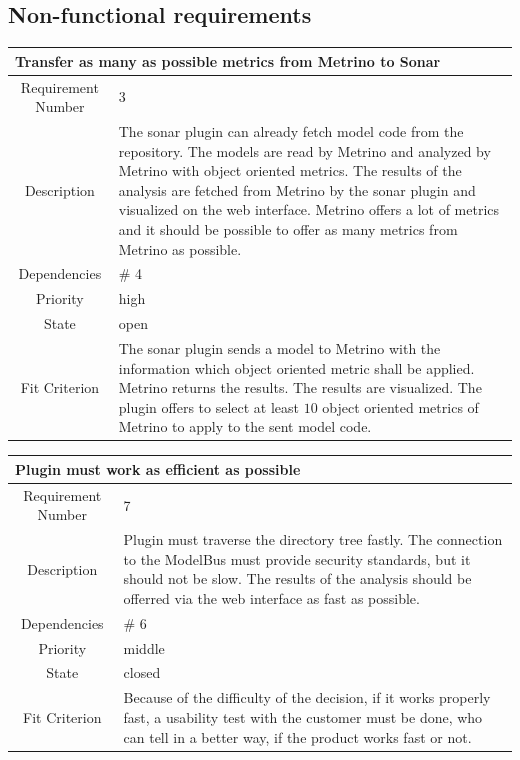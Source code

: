\subsection{Non-functional requirements}
\begin{longtable}{|c|p{10cm}|}
\hline 
\multicolumn{2}{|l|}{\textbf{Transfer as many as possible metrics from Metrino to Sonar}} \\ 
\hline 
Requirement Number & 3 \\ \hline 
Description & The sonar plugin can already fetch model code from the repository. The models are read by Metrino and analyzed by Metrino with object oriented metrics. The results of the analysis are fetched from Metrino by the sonar plugin and visualized on the web interface. Metrino offers a lot of metrics and it should be possible to offer as many metrics from Metrino as possible. \\ \hline 
Dependencies & \# 4 \\ \hline 
Priority & high \\ \hline 
State & open \\ \hline 
Fit Criterion & The sonar plugin sends a model to Metrino with the information which object oriented metric shall be applied. Metrino returns the results. The results are visualized. The plugin offers to select at least $10$ object oriented metrics of Metrino to apply to the sent model code. \\ \hline
\end{longtable}

\begin{longtable}{|c|p{10cm}|}
\hline 
\multicolumn{2}{|l|}{\textbf{Plugin must work as efficient as possible}} \\ 
\hline 
Requirement Number & 7 \\ \hline 
Description & Plugin must traverse the directory tree fastly. The connection to the ModelBus must provide security standards, but it should not be slow. The results of the analysis should be offerred via the web interface as fast as possible. \\ \hline 
Dependencies & \# 6 \\ \hline 
Priority & middle \\ \hline 
State & closed \\ \hline 
Fit Criterion & Because of the difficulty of the decision, if it works properly fast, a usability test with the customer must be done, who can tell in a better way, if the product works fast or not. \\ \hline
\end{longtable}

